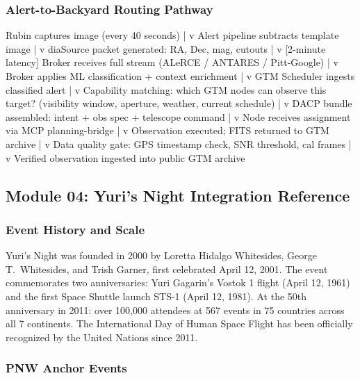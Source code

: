 \documentclass[11pt,letterpaper]{article}
\begin{document}
\subsubsection{Alert-to-Backyard Routing Pathway}

\begin{asciibox}
Rubin captures image (every 40 seconds)
       |
       v
Alert pipeline subtracts template image
       |
       v
diaSource packet generated: RA, Dec, mag, cutouts
       |
       v  [2-minute latency]
Broker receives full stream (ALeRCE / ANTARES / Pitt-Google)
       |
       v
Broker applies ML classification + context enrichment
       |
       v
GTM Scheduler ingests classified alert
       |
       v
Capability matching: which GTM nodes can observe this target?
(visibility window, aperture, weather, current schedule)
       |
       v
DACP bundle assembled: intent + obs spec + telescope command
       |
       v
Node receives assignment via MCP planning-bridge
       |
       v
Observation executed; FITS returned to GTM archive
       |
       v
Data quality gate: GPS timestamp check, SNR threshold, cal frames
       |
       v
Verified observation ingested into public GTM archive
\end{asciibox}

\subsection{Module 04: Yuri's Night Integration Reference}

\subsubsection{Event History and Scale}

Yuri's Night was founded in 2000 by Loretta Hidalgo Whitesides, George T.\ Whitesides, and Trish Garner, first celebrated April 12, 2001. The event commemorates two anniversaries: Yuri Gagarin's Vostok 1 flight (April 12, 1961) and the first Space Shuttle launch STS-1 (April 12, 1981). At the 50th anniversary in 2011: over 100,000 attendees at 567 events in 75 countries across all 7 continents. The International Day of Human Space Flight has been officially recognized by the United Nations since 2011.

\subsubsection{PNW Anchor Events}
\end{document}
